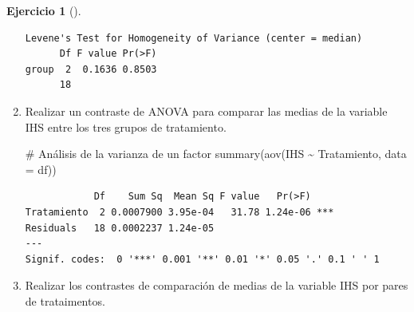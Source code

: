 \documentclass[
  a4paper,
]{scrreport}
\newenvironment{Shaded}{\begin{snugshade}}{\end{snugshade}}
\newcommand{\AttributeTok}[1]{\textcolor[rgb]{0.40,0.45,0.13}{#1}}
\newcommand{\CommentTok}[1]{\textcolor[rgb]{0.37,0.37,0.37}{#1}}
\newcommand{\FunctionTok}[1]{\textcolor[rgb]{0.28,0.35,0.67}{#1}}
\newcommand{\NormalTok}[1]{\textcolor[rgb]{0.00,0.23,0.31}{#1}}
\newcommand{\SpecialCharTok}[1]{\textcolor[rgb]{0.37,0.37,0.37}{#1}}
\theoremstyle{definition}
\newtheorem{exercise}{Ejercicio}[chapter]
\theoremstyle{definition}
\theoremstyle{remark}
\begin{document}
\begin{exercise}[]
\begin{enumerate}
\begin{tcolorbox}
\begin{verbatim}
Levene's Test for Homogeneity of Variance (center = median)
      Df F value Pr(>F)
group  2  0.1636 0.8503
      18               
\end{verbatim}

  \end{tcolorbox}
\item
  Realizar un contraste de ANOVA para comparar las medias de la variable
  IHS entre los tres grupos de tratamiento.

  \begin{tcolorbox}[enhanced jigsaw, title=\textcolor{quarto-callout-note-color}{\faInfo}\hspace{0.5em}{Solución}, titlerule=0mm, toprule=.15mm, colbacktitle=quarto-callout-note-color!10!white, arc=.35mm, colframe=quarto-callout-note-color-frame, opacitybacktitle=0.6, coltitle=black, left=2mm, colback=white, opacityback=0, breakable, bottomrule=.15mm, toptitle=1mm, leftrule=.75mm, bottomtitle=1mm, rightrule=.15mm]

\begin{Shaded}
\begin{Highlighting}[]
\CommentTok{\# Análisis de la varianza de un factor}
\FunctionTok{summary}\NormalTok{(}\FunctionTok{aov}\NormalTok{(IHS }\SpecialCharTok{\textasciitilde{}}\NormalTok{ Tratamiento, }\AttributeTok{data =}\NormalTok{ df))}
\end{Highlighting}
\end{Shaded}

\begin{verbatim}
            Df    Sum Sq  Mean Sq F value   Pr(>F)    
Tratamiento  2 0.0007900 3.95e-04   31.78 1.24e-06 ***
Residuals   18 0.0002237 1.24e-05                     
---
Signif. codes:  0 '***' 0.001 '**' 0.01 '*' 0.05 '.' 0.1 ' ' 1
\end{verbatim}

  \end{tcolorbox}
\item
  Realizar los contrastes de comparación de medias de la variable IHS
  por pares de trataimentos.

  \begin{tcolorbox}[enhanced jigsaw, title=\textcolor{quarto-callout-note-color}{\faInfo}\hspace{0.5em}{Solución}, titlerule=0mm, toprule=.15mm, colbacktitle=quarto-callout-note-color!10!white, arc=.35mm, colframe=quarto-callout-note-color-frame, opacitybacktitle=0.6, coltitle=black, left=2mm, colback=white, opacityback=0, breakable, bottomrule=.15mm, toptitle=1mm, leftrule=.75mm, bottomtitle=1mm, rightrule=.15mm]


\end{tcolorbox}
\end{enumerate}
\end{exercise}
\end{document}
